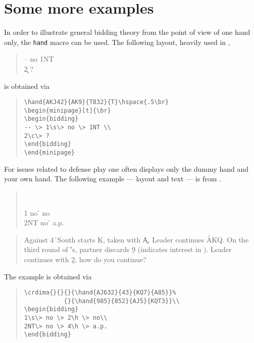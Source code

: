 \section{Some more examples}
In order to illustrate general bidding theory
from the point of view of one hand only,
the \verb=hand= macro can be used.
The following layout, heavily used in \cite{EC},
\begin{quote}
\hspace{.5\br}
\begin{minipage}[t]{\br}
\begin{bidding}
-- \s\> no \> 1NT \\
2\c\> ?
\end{bidding}
\end{minipage}
\end{quote}
is obtained via
\begin{quote}
\begin{verbatim}
\hand{AKJ42}{AK9}{T832}{T}\hspace{.5\br}
\begin{minipage}[t]{\br}
\begin{bidding}
-- \> 1\s\> no \> 1NT \\
2\c\> ?
\end{bidding}
\end{minipage}
\end{verbatim}
\end{quote}
For issues related to defense play one often displays
only the dummy hand and your own hand.
The following example --- layout and text ---
is from \cite{Br}.
\begin{quote}
%
           {}{}\\
\begin{bidding}
1\s\> no \h \> no\\
2NT\> no \h \> a.p.
\end{bidding}
\end{quote}
\begin{quote}
Against 4\h\ South starts \c K, taken
with \c A. Leader continues \h AKQ. On the third
round of \h's, partner discards \d 9 (indicates
interest in \s). Leader continues with \d 2,
how do you continue?
\end{quote}
The example is obtained via
\begin{quote}
\begin{verbatim}
\crdima{}{}{}{\hand{AJ632}{43}{KQ7}{A85}}%
           {}{\hand{985}{852}{AJ5}{KQT3}}\\
\begin{bidding}
1\s\> no \> 2\h \> no\\
2NT\> no \> 4\h \> a.p.
\end{bidding}
\end{verbatim}
\end{quote}
